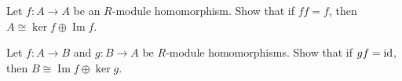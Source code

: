 \documentclass{problemset}
\DeclareMathOperator{\im}{Im}
\begin{document}
\begin{exercise} 
Let \(f: A \to A\) be an \(R\)-module homomorphism.  Show that if \(ff=f\), then \(A \cong \ker f \oplus \im f\).
\end{exercise}


\begin{exercise} Let \(f: A \to B\) and \(g: B \to A\) be \(R\)-module homomorphisms.  Show that if \(gf={\rm id}\), then \(B \cong \im f \oplus \ker g\).
\end{exercise}





\end{document}

